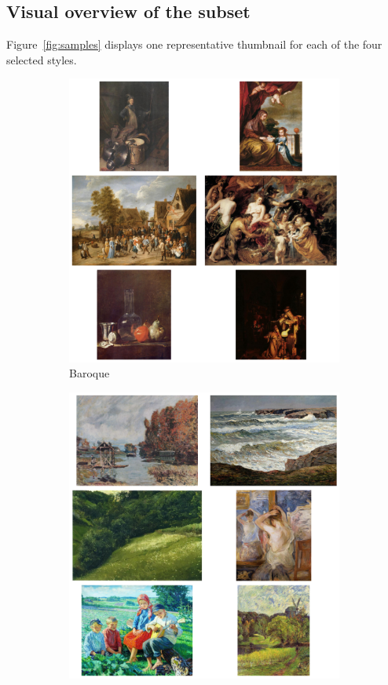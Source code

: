 \documentclass[a4paper,11pt]{article}
\begin{document}
\subsection{Visual overview of the subset}
Figure~\ref{fig:samples} displays one representative thumbnail for each of the four selected styles.

\begin{figure}[htbp]
    \centering
    \begin{subfigure}[t]{.24\textwidth}
        \includegraphics[width=\linewidth]{figures/Baroque.png}
        \caption{Baroque}
    \end{subfigure}
    \begin{subfigure}[t]{.24\textwidth}
        \includegraphics[width=\linewidth]{figures/Impressionism.png}

\end{subfigure}
\end{figure}
\end{document}
